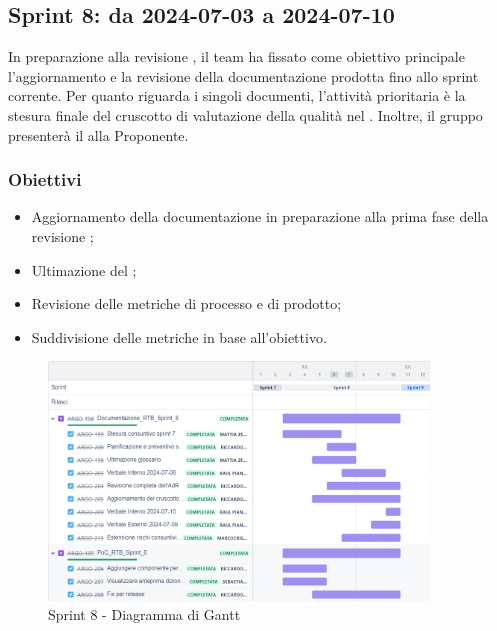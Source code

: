 \subsection{Sprint 8: da 2024-07-03 a 2024-07-10}
\par In preparazione alla revisione , il team ha fissato come obiettivo principale l’aggiornamento e la revisione della documentazione prodotta fino allo sprint corrente. Per quanto riguarda i singoli documenti, l’attività prioritaria è la stesura finale del cruscotto di valutazione della qualità nel \PdQ. Inoltre, il gruppo presenterà il  alla Proponente.

\subsubsection{Obiettivi}
\begin{itemize}
  \item Aggiornamento della documentazione in preparazione alla prima fase della revisione ;
  \item Ultimazione del ;
  \item Revisione delle metriche di processo e di prodotto;
  \item Suddivisione delle metriche in base all'obiettivo.
\end{itemize}

\begin{figure}[H]
  \centering
  \includegraphics[width=0.90\textwidth]{assets/Pianificazione/Sprint-8/gantt.png}
  \caption{Sprint 8 - Diagramma di Gantt}\label{fig:sprint-8-gantt}
\end{figure}
